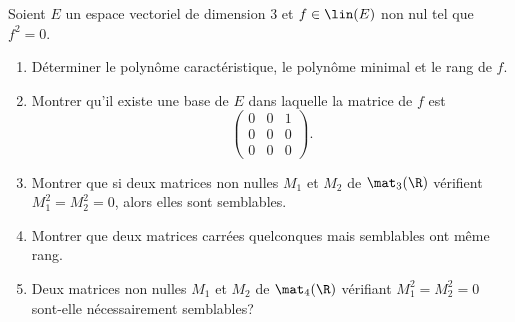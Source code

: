 \begin{enonce}
\begin{exercise}[ID={RMS135 E1416},subtitle={CCINP MP 2024},tags={},difficulty={}]
Soient $E$ un espace vectoriel de dimension $3$ et $f \in \lin(E)$ non nul tel que $f^2 = 0$.
\begin{enumerate}
  \item Déterminer le polynôme caractéristique, le polynôme minimal et le rang de $f$.
  \item Montrer qu’il existe une base de $E$ dans laquelle la matrice de $f$ est 
  \[ \begin{pmatrix} 0 & 0 & 1 \\ 0 & 0 & 0 \\ 0 & 0 & 0 \end{pmatrix}. \]
  \item Montrer que si deux matrices non nulles $M_1$ et $M_2$ de $\mat_3(\R)$ vérifient $M_1^2 = M_2^2 = 0$, alors elles sont semblables.

  \item Montrer que deux matrices carrées quelconques mais semblables ont même rang.

  \item Deux matrices non nulles $M_1$ et $M_2$ de $\mat_4(\R)$ vérifiant $M_1^2=M_2^2=0$ sont-elle nécessairement semblables?
\end{enumerate}
\end{exercise}
\begin{solution}
\end{solution}
\end{enonce}
